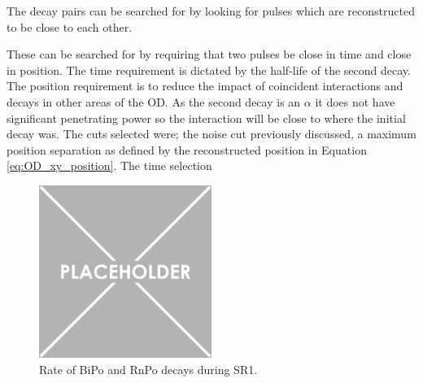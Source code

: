 \par
The decay pairs can be searched for by looking for pulses which are reconstructed to be close to each other.

These can be searched for by requiring that two pulses be close in time and close in position. 
The time requirement is dictated by the half-life of the second decay.
The position requirement is to reduce the impact of coincident interactions and decays in other areas of the OD.
As the second decay is an $\alpha$ it does not have significant penetrating power so the interaction will be close to where the initial decay was.
The cuts selected were; the noise cut previously discussed, a maximum position separation as defined by the reconstructed position in Equation \ref{eq:OD_xy_position}.
The time selection

\begin{figure}
    \centering
    \includegraphics[width=0.5\textwidth]{Figures/Placeholder.png}
    \caption{Rate of BiPo and RnPo decays during SR1.}
    \label{fig:OD_BiPo_Rate}
\end{figure}

